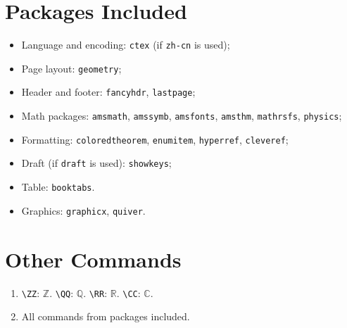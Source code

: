 \documentclass[a4paper,10pt]{article}
\begin{document}
\section{Packages Included}
\begin{itemize}
    \item Language and encoding: \texttt{ctex} (if \texttt{zh-cn} is used);
    \item Page layout: \texttt{geometry};
    \item Header and footer: \texttt{fancyhdr}, \texttt{lastpage};
    \item Math packages: \texttt{amsmath}, \texttt{amssymb}, \texttt{amsfonts}, \texttt{amsthm}, \texttt{mathrsfs}, \texttt{physics};
    \item Formatting: \texttt{coloredtheorem}, \texttt{enumitem}, \texttt{hyperref}, \texttt{cleveref};
    \item Draft (if \texttt{draft} is used): \texttt{showkeys}; 
    \item Table: \texttt{booktabs}.
    \item Graphics: \texttt{graphicx}, \texttt{quiver}.
\end{itemize}

\section{Other Commands}
\begin{enumerate}
    \item \texttt{\textbackslash ZZ}: \(\mathbb Z\). \texttt{\textbackslash QQ}: \(\mathbb Q\). \texttt{\textbackslash RR}: \(\mathbb R\). \texttt{\textbackslash CC}: \(\mathbb C\).
    \item All commands from packages included.
\end{enumerate}
\end{document}
